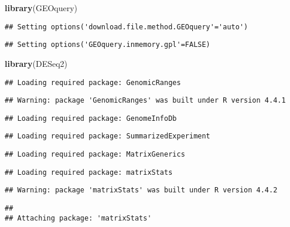 \documentclass[
]{article}
\newenvironment{Shaded}{\begin{snugshade}}{\end{snugshade}}
\newcommand{\FunctionTok}[1]{\textcolor[rgb]{0.13,0.29,0.53}{\textbf{#1}}}
\newcommand{\NormalTok}[1]{#1}
\begin{document}
\begin{Shaded}
\begin{Highlighting}[]
\FunctionTok{library}\NormalTok{(GEOquery)}
\end{Highlighting}
\end{Shaded}

\begin{verbatim}
## Setting options('download.file.method.GEOquery'='auto')
\end{verbatim}

\begin{verbatim}
## Setting options('GEOquery.inmemory.gpl'=FALSE)
\end{verbatim}

\begin{Shaded}
\begin{Highlighting}[]
\FunctionTok{library}\NormalTok{(DESeq2)}
\end{Highlighting}
\end{Shaded}

\begin{verbatim}
## Loading required package: GenomicRanges
\end{verbatim}

\begin{verbatim}
## Warning: package 'GenomicRanges' was built under R version 4.4.1
\end{verbatim}

\begin{verbatim}
## Loading required package: GenomeInfoDb
\end{verbatim}

\begin{verbatim}
## Loading required package: SummarizedExperiment
\end{verbatim}

\begin{verbatim}
## Loading required package: MatrixGenerics
\end{verbatim}

\begin{verbatim}
## Loading required package: matrixStats
\end{verbatim}

\begin{verbatim}
## Warning: package 'matrixStats' was built under R version 4.4.2
\end{verbatim}

\begin{verbatim}
## 
## Attaching package: 'matrixStats'
\end{verbatim}
\end{document}
